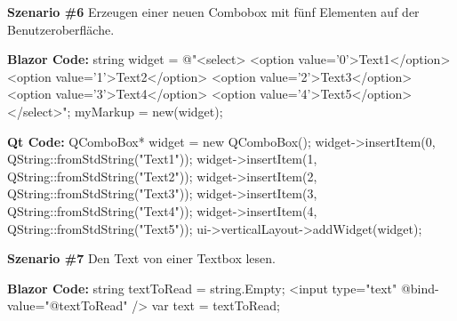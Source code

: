 \textbf{Szenario \#6}
\newline
Erzeugen einer neuen Combobox mit fünf Elementen auf der Benutzeroberfläche.

\begin{zitat}
    \textbf{Blazor Code:}
    \newline
    string widget = @"<select>
    \newline
    <option value='0'>Text1</option>
    \newline
    <option value='1'>Text2</option>
    \newline
    <option value='2'>Text3</option>
    \newline
    <option value='3'>Text4</option>
    \newline
    <option value='4'>Text5</option>
    \newline
    </select>";
    \newline
    myMarkup = new(widget);
\end{zitat}

\begin{zitat}
    \textbf{Qt Code:}
    \newline
    QComboBox* widget = new QComboBox();
    \newline
    widget->insertItem(0, QString::fromStdString("Text1"));
    \newline
    widget->insertItem(1, QString::fromStdString("Text2"));
    \newline
    widget->insertItem(2, QString::fromStdString("Text3"));
    \newline
    widget->insertItem(3, QString::fromStdString("Text4"));
    \newline
    widget->insertItem(4, QString::fromStdString("Text5"));
    \newline
    ui->verticalLayout->addWidget(widget);
\end{zitat}
\newline
\newline

\textbf{Szenario \#7}
\newline
Den Text von einer Textbox lesen.

\begin{zitat}
    \textbf{Blazor Code:}
    \newline
    string textToRead = string.Empty;
    \newline
    <input type="text" @bind-value="@textToRead" />
    \newline
    var text = textToRead;
\end{zitat}

